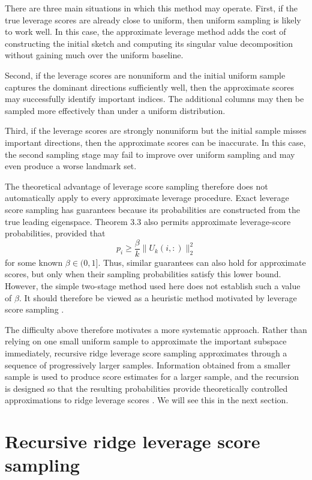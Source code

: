 There are three main situations in which this method may operate. First, if the true leverage scores are already close to uniform, then uniform sampling is likely to work well. In this case, the approximate leverage method adds the cost of constructing the initial sketch and computing its singular value decomposition without gaining much over the uniform baseline.

Second, if the leverage scores are nonuniform and the initial uniform sample captures the dominant directions sufficiently well, then the approximate scores may successfully identify important indices. The additional columns may then be sampled more effectively than under a uniform distribution.

Third, if the leverage scores are strongly nonuniform but the initial sample misses important directions, then the approximate scores can be inaccurate. In this case, the second sampling stage may fail to improve over uniform sampling and may even produce a worse landmark set.

The theoretical advantage of leverage score sampling therefore does not automatically apply to every approximate leverage procedure. Exact leverage score sampling has guarantees because its probabilities are constructed from the true leading eigenspace. Theorem 3.3 also permits approximate leverage-score probabilities, provided that
\[
p_i\geq\frac{\beta}{k}\|U_k(i,:)\|_2^2
\]
for some known $\beta\in(0,1]$. Thus, similar guarantees can also hold for approximate scores, but only when their sampling probabilities satisfy this lower bound. However, the simple two-stage method used here does not establish such a value of $\beta$. It should therefore be viewed as a heuristic method motivated by leverage score sampling \citep[Lemma~5]{gittens2016revisiting}. 

The difficulty above therefore motivates a more systematic approach. Rather than relying on one small uniform sample to approximate the important subspace immediately, recursive ridge leverage score sampling approximates through a sequence of progressively larger samples. Information obtained from a smaller sample is used to produce score estimates for a larger sample, and the recursion is designed so that the resulting probabilities provide theoretically controlled approximations to ridge leverage scores \cite{musco2017recursive}. We will see this in the next section.

\section{Recursive ridge leverage score sampling}

